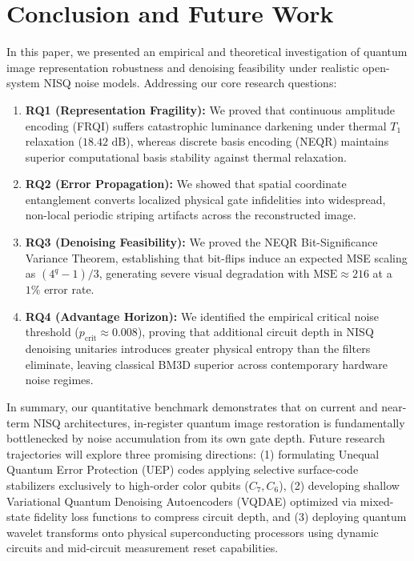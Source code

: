 \documentclass[12pt,onecolumn,draftclsnofoot]{IEEEtran}
\begin{document}
\FloatBarrier
\section{Conclusion and Future Work}
In this paper, we presented an empirical and theoretical investigation of quantum image representation robustness and denoising feasibility under realistic open-system NISQ noise models. Addressing our core research questions:
\begin{enumerate}
    \item \textbf{RQ1 (Representation Fragility):} We proved that continuous amplitude encoding (FRQI) suffers catastrophic luminance darkening under thermal $T_1$ relaxation ($18.42\text{ dB}$), whereas discrete basis encoding (NEQR) maintains superior computational basis stability against thermal relaxation.
    \item \textbf{RQ2 (Error Propagation):} We showed that spatial coordinate entanglement converts localized physical gate infidelities into widespread, non-local periodic striping artifacts across the reconstructed image.
    \item \textbf{RQ3 (Denoising Feasibility):} We proved the NEQR Bit-Significance Variance Theorem, establishing that bit-flips induce an expected MSE scaling as $(4^q - 1)/3$, generating severe visual degradation with $\text{MSE} \approx 216$ at a $1\%$ error rate.
    \item \textbf{RQ4 (Advantage Horizon):} We identified the empirical critical noise threshold ($p_{\text{crit}} \approx 0.008$), proving that additional circuit depth in NISQ denoising unitaries introduces greater physical entropy than the filters eliminate, leaving classical BM3D superior across contemporary hardware noise regimes.
\end{enumerate}

In summary, our quantitative benchmark demonstrates that on current and near-term NISQ architectures, in-register quantum image restoration is fundamentally bottlenecked by noise accumulation from its own gate depth. Future research trajectories will explore three promising directions: (1) formulating Unequal Quantum Error Protection (UEP) codes applying selective surface-code stabilizers exclusively to high-order color qubits ($C_7, C_6$), (2) developing shallow Variational Quantum Denoising Autoencoders (VQDAE) optimized via mixed-state fidelity loss functions to compress circuit depth, and (3) deploying quantum wavelet transforms onto physical superconducting processors using dynamic circuits and mid-circuit measurement reset capabilities.
\end{document}
